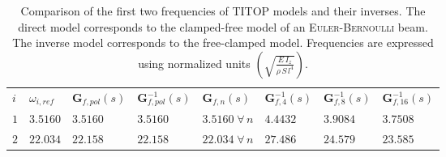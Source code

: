 \begin{table}[htbp!]
\caption{Comparison of the first two frequencies of TITOP models and their inverses. The direct model corresponds to the clamped-free model of an \textsc{Euler-Bernoulli} beam. The inverse model corresponds to the free-clamped model. Frequencies are expressed using normalized units $\left(\sqrt{\frac{E\,I_z}{\rho\,S\,l^4}}\right)$.}
\label{tab:datac}       %
\begin{tabular}{llllllll}
\hline\noalign{\smallskip}
  $i$ & $\omega_{i,ref}$ &  $\mathbf{G}_{f,pol}(s)$ &  $\mathbf{G}_{f,pol}^{-1}(s)$ &  $\mathbf{G}_{f,n}(s)$ &  $\mathbf{G}_{f,4}^{-1}(s)$  &  $\mathbf{G}_{f,8}^{-1}(s)$ &  $\mathbf{G}_{f,16}^{-1}(s)$ \\
\noalign{\smallskip}\hline\noalign{\smallskip}
$1$ & $3.5160$ & $3.5160$ & $3.5160$ & $3.5160\;\forall\,n$ & $4.4432$ & $3.9084$ & $3.7508$\\ 
$2$ & $22.034$ & $22.158$ & $22.158$ & $22.034\;\forall\,n$ & $27.486$ & $24.579$ & $23.585$\\ 
\hline
\end{tabular}
\end{table}

